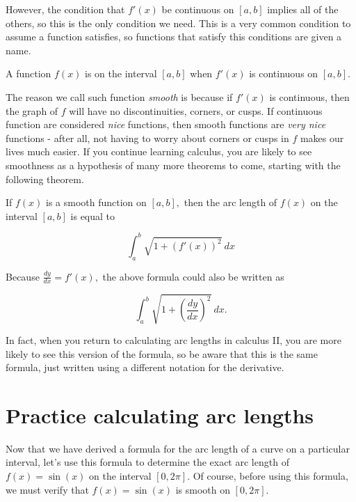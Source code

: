 \documentclass[handout,nooutcomes]{ximera}
\begin{document}
However, the condition that $f'(x)$ be continuous on $[a,b]$ implies all of the others, so this is the only condition we need.  This is a very common condition to assume a function satisfies, so functions that satisfy this conditions are given a name.  

\begin{definition}
A function $f(x)$ is  on the interval $[a,b]$ when $f'(x)$ is continuous on $[a,b].$
\end{definition}

The reason we call such function \textit{smooth} is because if $f'(x)$ is continuous, then the graph of $f$ will have no discontinuities, corners, or cusps.  If continuous function are considered \textit{nice} functions, then smooth functions are \textit{very nice} functions - after all, not having to worry about corners or cusps in $f$ makes our lives much easier.  If you continue learning calculus, you are likely to see smoothness as a hypothesis of many more theorems to come, starting with the following theorem. 

\begin{theorem}
If $f(x)$ is a smooth function on $[a,b],$ then the arc length of $f(x)$ on the interval $[a,b]$ is equal to 

$$\displaystyle\int_{a}^{b} \sqrt{1+(f'(x))^2} \ dx$$

\end{theorem}

\begin{warning}
Because $\frac{dy}{dx} = f'(x),$ the above formula could also be written as 

$$\displaystyle\int_{a}^{b} \sqrt{1+(\frac{dy}{dx})^2} \ dx.$$ 

In fact, when you return to calculating arc lengths in calculus II, you are more likely to see this version of the formula, so be aware that this is the same formula, just written using a different notation for the derivative.
\end{warning}

\section{Practice calculating arc lengths}


Now that we have derived a formula for the arc length of a curve on a particular interval, let's use this formula to determine the exact arc length of $f(x)=\sin(x)$ on the interval $[0,2\pi]$.  Of course, before using this formula, we must verify that $f(x)=\sin(x)$ is smooth on $[0,2\pi]$.
\end{document}

